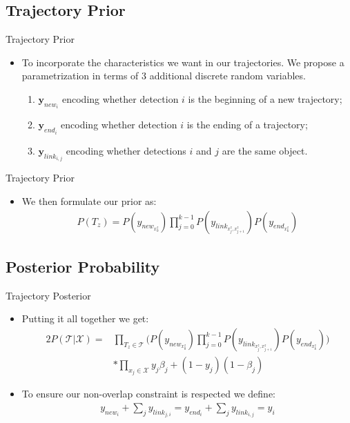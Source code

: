 \subsection{Trajectory Prior}
\begin{frame}{Trajectory Prior}
	\begin{itemize}
		\item To incorporate the characteristics we want in our trajectories. We propose a parametrization in terms of 3 additional discrete random variables.
		\begin{enumerate}
			\item ${\mathbf y_{new_i}}$ encoding whether detection $i$ is the beginning of a new trajectory;
			\item ${\mathbf y_{end_i}}$ encoding whether detection $i$ is the ending of a trajectory;
			\item ${\mathbf y_{link_{i,j}}}$ encoding whether detections $i$ and $j$ are the same object.
		\end{enumerate}
	\end{itemize}
\end{frame}

\begin{frame}{Trajectory Prior}
	\begin{itemize}
		\item We then formulate our prior as:
		\begin{gather*}
			P(T_z) = P(y_{new_{x_0^z}}) \prod_{j=0}^{k-1}P(y_{link_{x_j^z,x_{j+1}^z}}) P(y_{end_x_k^z})
		\end{gather*}
	\end{itemize}
\end{frame}


\subsection{Posterior Probability}
\begin{frame}{Trajectory Posterior}
	\begin{itemize}
		\item Putting it all together we get:
		\begin{alignat*}{2}
			P(\mathcal{T}|\mathcal{X}) = &\prod_{T_z \in \mathcal{T}} \Big( P(y_{new_{x_0^z}}) \prod_{j=0}^{k-1}P(y_{link_{x_j^z,x_{j+1}^z}}) P(y_{end_x_k^z}) \Big)\\
			&*\prod_{x_j \in \mathcal{X}} y_j \beta_j + (1-y_j)(1-\beta_j)
		\end{alignat*}
		\item To ensure our non-overlap constraint is respected we define:
		\begin{gather*}
			y_{new_i} + \sum_j y_{link_{j,i}} = y_{end_i} + \sum_j y_{link_{i,j}} = y_i
		\end{gather*}
	\end{itemize}
\end{frame}


